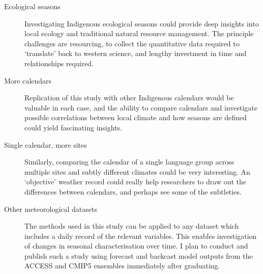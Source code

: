 \begin{description}
\item[Ecological seasons]
        Investigating Indigenous ecological seasons could provide deep insights
        into local ecology and traditional natural resource management.
        The principle challenges are resourcing, to collect the quantitative
        data required to `translate' back to western science, and lengthy
        investment in time and relationships required.

\item [More calendars]
        Replication of this study with other Indigenous calendars would be
        valuable in each case, and the ability to compare calendars and investigate
        possible correlations between local climate and how seasons are
        defined could yield fascinating insights.

\item [Single calendar, more sites]
        Similarly, comparing the calendar of a single language group across
        multiple sites and subtly different climates could be very interesting.
        An `objective' weather record could really help researchers to draw out
        the differences between calendars, and perhaps see some of the subtleties.

\item [Other meteorological datasets]
        The methods used in this study can be applied to any dataset which
        includes a daily record of the relevant variables.  This enables
        investigation of changes in seasonal characterisation over time.
        I plan to conduct and publish such a study using forecast and backcast
        model outputs from the ACCESS and CMIP5 ensembles immediately
        after graduating.

\item []


\end{description}



